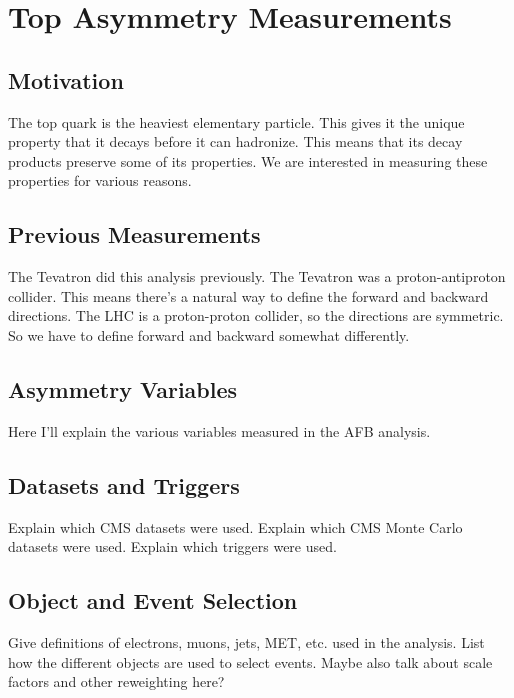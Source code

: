 \chapter{Top Asymmetry Measurements}
\label{chap:afb}

\section{Motivation}
\label{sec:afbmotivation}

The top quark is the heaviest elementary particle.
This gives it the unique property that it decays before it can hadronize.
This means that its decay products preserve some of its properties.
We are interested in measuring these properties for various reasons.

\section{Previous Measurements}
\label{sec:afbtevatron}

The Tevatron did this analysis previously.
The Tevatron was a proton-antiproton collider.
This means there's a natural way to define the forward and
backward directions.
The LHC is a proton-proton collider, so the directions are symmetric.
So we have to define forward and backward somewhat differently.

\section{Asymmetry Variables}
\label{sec:afbvariables}

Here I'll explain the various variables measured in the AFB analysis.

\section{Datasets and Triggers}
\label{sec:afbdatatrig}

Explain which CMS datasets were used.
Explain which CMS Monte Carlo datasets were used.
Explain which triggers were used.

\section{Object and Event Selection}
\label{sec:afbselections}

Give definitions of electrons, muons, jets, MET, etc. used in the analysis.
List how the different objects are used to select events.
Maybe also talk about scale factors and other reweighting here?

